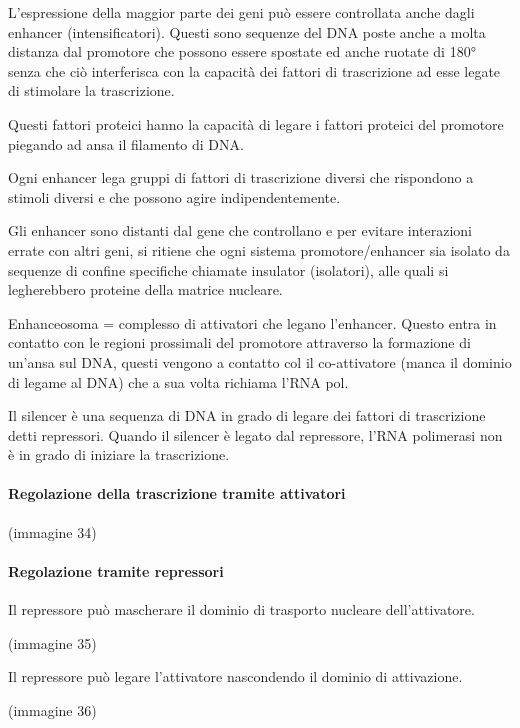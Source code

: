 \documentclass[11pt]{book}
\begin{document}
L'espressione della maggior parte dei geni può essere controllata anche
dagli enhancer (intensificatori). Questi sono sequenze del DNA poste
anche a molta distanza dal promotore che possono essere spostate ed
anche ruotate di 180° senza che ciò interferisca con la capacità dei
fattori di trascrizione ad esse legate di stimolare la trascrizione.

Questi fattori proteici hanno la capacità di legare i fattori proteici
del promotore piegando ad ansa il filamento di DNA.

Ogni enhancer lega gruppi di fattori di trascrizione diversi che
rispondono a stimoli diversi e che possono agire indipendentemente.

Gli enhancer sono distanti dal gene che controllano e per evitare
interazioni errate con altri geni, si ritiene che ogni sistema
promotore/enhancer sia isolato da sequenze di confine specifiche
chiamate insulator (isolatori), alle quali si legherebbero proteine
della matrice nucleare.

Enhanceosoma = complesso di attivatori che legano l'enhancer. Questo
entra in contatto con le regioni prossimali del promotore attraverso la
formazione di un'ansa sul DNA, questi vengono a contatto col il
co-attivatore (manca il dominio di legame al DNA) che a sua volta
richiama l'RNA pol.

Il silencer è una sequenza di DNA in grado di legare dei fattori di
trascrizione detti repressori. Quando il silencer è legato dal
repressore, l'RNA polimerasi non è in grado di iniziare la trascrizione.

\paragraph{Regolazione della trascrizione tramite
attivatori}\label{regolazione-della-trascrizione-tramite-attivatori}

(immagine 34)

\paragraph{Regolazione tramite
repressori}\label{regolazione-tramite-repressori}

Il repressore può mascherare il dominio di trasporto nucleare
dell'attivatore.

(immagine 35)

Il repressore può legare l'attivatore nascondendo il dominio di
attivazione.

(immagine 36)
\end{document}
